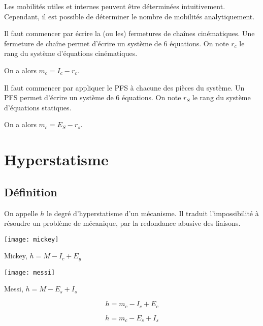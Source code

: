 Les mobilités utiles et internes peuvent être déterminées intuitivement. Cependant, il est possible de déterminer le nombre de mobilités analytiquement. 


\begin{multicols}{2}
\begin{methode}

Il faut commencer par écrire la (ou les) fermetures de chaînes cinématiques. Une fermeture de chaîne permet d'écrire un système de 6 équations. On note $r_c$ le rang du système d'équations cinématiques.

On a alors $m_c = I_c -r_c$.   
\end{methode}

\begin{methode}

Il faut commencer par appliquer le PFS à chacune des pièces du système. Un PFS permet d'écrire un système de 6 équations. On note $r_S$ le rang du système d'équations statiques.

On a alors $m_c =E_S - r_s$.   
\end{methode}
\end{multicols}
		
\section{Hyperstatisme}
\subsection{Définition}
On appelle $h$ le degré d'hyperstatisme d'un mécanisme.
Il traduit l'impossibilité à résoudre un problème de mécanique, par la redondance abusive des liaisons.
			
\begin{marginfigure}
\centering
\texttt{[image: mickey]}
\caption{Mickey, $h=M-I_c+E_y$}
\end{marginfigure}


\begin{marginfigure}
\centering
\texttt{[image: messi]}
\caption{Messi, $h=M-E_s+I_s$}
\end{marginfigure}

\begin{multicols}{2}
\begin{methode}[en cinématique]
$$
h=m_c-I_c+E_c
$$
\end{methode}
\begin{methode}[en statique]

$$
h=m_c-E_s+I_s
$$
\end{methode}
\end{multicols}

